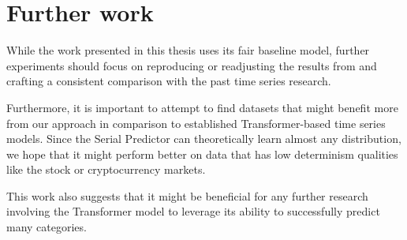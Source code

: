 \documentclass[en]{pracamgr}
\begin{document}
	\section{Further work}
	
	While the work presented in this thesis uses its fair baseline model, further experiments should focus on reproducing or readjusting the results from \cite{enhancing} and crafting a consistent comparison with the past time series research.
	
	Furthermore, it is important to attempt to find datasets that might benefit more from our approach in comparison to established Transformer-based time series models. Since the Serial Predictor can theoretically learn almost any distribution, we hope that it might perform better on data that has low determinism qualities like the stock or cryptocurrency markets.
	
	This work also suggests that it might be beneficial for any further research involving the Transformer model to leverage its ability to successfully predict many categories.
	
\end{document}
